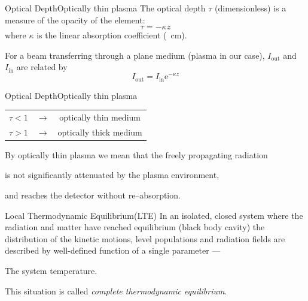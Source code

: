 \documentclass[draft]{beamer}
\begin{document}
\newcommand{\opticaldepth}{Optical Depth}
\begin{frame}{\opticaldepth}{Optically thin plasma}
  The optical depth $\tau$ (dimensionless) is a measure of the opacity of the element:
  \begin{equation*}
    \tau=-\kappa z
  \end{equation*}
  where $\kappa$ is the linear absorption coefficient (\si{\per\cm}).

  For a beam transferring through a plane medium (plasma in our case), $I_\text{out}$ and $I_\text{in}$ are related by
  \begin{equation*}
    I_\text{out} = I_\text{in}\mathrm{e}^{-\kappa z} %
  \end{equation*}

\begin{figure}
    \centering
    
\end{figure}

\end{frame}
\begin{frame}{\opticaldepth}{Optically thin plasma}
 \begin{center}
\begin{tabular}{ c c c }
  $\tau<1$ & $\longrightarrow$ & optically thin medium\\ 
  $\tau>1$ & $\longrightarrow$ & optically thick medium
\end{tabular}
\end{center}
By optically thin plasma we mean that the freely propagating radiation

is not significantly attenuated by the plasma environment, 

and reaches the detector without re--absorption.
\end{frame}
\newcommand{\lte}{Local Thermodynamic Equilibrium(LTE)}
\begin{frame}{\lte}
  In an isolated, closed system where the radiation and matter have reached equilibrium (black body cavity) the distribution of the kinetic motions, level populations and radiation fields are described by well-defined function of a single parameter ---

  The system temperature.

  This situation is called \emph{complete thermodynamic equilibrium}.
\end{frame}
\end{document}

